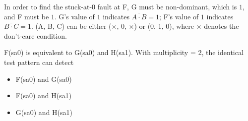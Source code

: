 In order to find the stuck-at-0 fault at F, G must be non-dominant, which is $1$, and F must be $1$. G's value of $1$ indicates $\overline{A \cdot B} = 1$; F's value of $1$ indicates $\overline{B \cdot C} = 1$. (A, B, C) can be either ($\times$, 0, $\times$) or (0, 1, 0), where $\times$ denotes the don't-care condition.

F(sa0) is equivalent to G(sa0) and H(sa1). With multiplicity = 2, the identical test pattern can detect

\begin{itemize}
\item F(sa0) and G(sa0)
\item F(sa0) and H(sa1)
\item G(sa0) and H(sa1)
\end{itemize}


